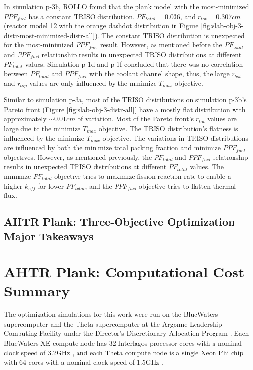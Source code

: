 In simulation p-3b, \gls{ROLLO} found that the plank model with the most-minimized 
$PPF_{fuel}$ has a constant TRISO distribution, $PF_{total} = 0.036$, and 
$r_{tot}=0.307cm$ (reactor model 12 with the orange dashdot distribution in Figure 
\ref{fig:slab-obj-3-distr-most-minimized-distr-all}).
The constant TRISO distribution is unexpected for the most-minimized $PPF_{fuel}$ result. 
However, as mentioned before the $PF_{total}$ and $PPF_{fuel}$ relationship
results in unexpected TRISO distributions at different $PF_{total}$ values. 
Simulation p-1d and p-1f concluded that there was no correlation between $PF_{total}$ 
and $PPF_{fuel}$ with the coolant channel shape, thus, the large $r_{bot}$ and $r_{top}$ 
values are only influenced by the minimize $T_{max}$ objective. 

Similar to simulation p-3a, most of the \gls{TRISO} distributions on simulation 
p-3b's Pareto front (Figure \ref{fig:slab-obj-3-distr-all}) have a mostly flat 
distribution with approximately $\sim0.01cm$ of variation. 
Most of the Pareto front's $r_{tot}$ values are large due to the minimize $T_{max}$ 
objective. 
The TRISO distribution's flatness is influenced by the minimize $T_{max}$ objective. 
The variations in \gls{TRISO} distributions are influenced by both the minimize 
total packing fraction and minimize $PPF_{fuel}$ objectives. 
However, as mentioned previously, the $PF_{total}$ and $PPF_{fuel}$ relationship
results in unexpected TRISO distributions at different $PF_{total}$ values. 
The minimize $PF_{total}$ objective tries to maximize fission reaction rate
to enable a higher $k_{eff}$ for lower $PF_{total}$, and 
the $PPF_{fuel}$ objective tries to flatten thermal flux. 

\subsection{AHTR Plank: Three-Objective Optimization Major Takeaways}

\section{AHTR Plank: Computational Cost Summary}
\label{sec:plank-compute-cost}
The optimization simulations for this work were run on the BlueWaters supercomputer 
\cite{ncsa_about_2017} and the Theta supercomputer at the Argonne Leadership Computing 
Facility under the Director's Discretionary Allocation Program 
\cite{noauthor_argonne_2022}. 
Each BlueWaters XE compute node has 32 Interlagos processor cores with a nominal 
clock speed of 3.2GHz \cite{ncsa_about_2017}, and each Theta compute node is a single 
Xeon Phi chip with 64 cores with a nominal clock speed of 1.5GHz 
\cite{noauthor_argonne_2022}.  

